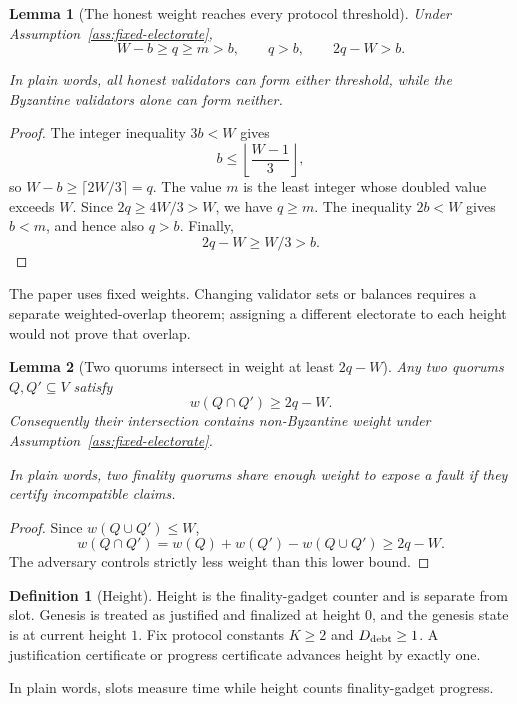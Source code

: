 \ifx\litemode\undefined\documentclass{article}\fi
\theoremstyle{plain}
\newtheorem{lemma}{Lemma}
\theoremstyle{definition}
\newtheorem{definition}{Definition}
\theoremstyle{remark}
\begin{document}
\begin{lemma}[The honest weight reaches every protocol threshold]
\label{lem:integer-thresholds}
Under Assumption~\ref{ass:fixed-electorate},
\[
  W-b\geq q\geq m>b,\qquad q>b,\qquad 2q-W>b.
\]

In plain words, all honest validators can form either threshold, while the
Byzantine validators alone can form neither.
\end{lemma}

\begin{proof}
The integer inequality \(3b<W\) gives
\[
 b\leq\left\lfloor\frac{W-1}{3}\right\rfloor,
\]
so \(W-b\geq\lceil2W/3\rceil=q\).  The value \(m\) is the least integer
whose doubled value exceeds \(W\).  Since \(2q\geq4W/3>W\), we have
\(q\geq m\).  The inequality \(2b<W\) gives \(b<m\), and hence also
\(q>b\).  Finally,
\[
 2q-W\geq W/3>b.
\]
\end{proof}

The paper uses fixed weights.  Changing validator sets or balances requires
a separate weighted-overlap theorem; assigning a different electorate to
each height would not prove that overlap.

\begin{lemma}[Two quorums intersect in weight at least \(2q-W\)]\label{lem:quorum-intersection}
Any two quorums \(Q,Q'\subseteq V\) satisfy
\[
  w(Q\cap Q')\geq 2q-W.
\]
Consequently their intersection contains non-Byzantine weight under
Assumption~\ref{ass:fixed-electorate}.

In plain words, two finality quorums share enough weight to expose a fault if
they certify incompatible claims.
\end{lemma}

\begin{proof}
Since \(w(Q\cup Q')\leq W\),
\[
 w(Q\cap Q')=w(Q)+w(Q')-w(Q\cup Q')
 \geq 2q-W.
\]
The adversary controls strictly less weight than this lower bound.
\end{proof}

\begin{definition}[Height]\label{def:height}
Height is the finality-gadget counter and is separate from slot.  Genesis is
treated as justified and finalized at height \(0\), and the genesis state is
at current height \(1\).  Fix protocol constants \(K\geq2\) and
\(D_{\rm debt}\geq1\).
A justification certificate or progress certificate advances height by
exactly one.

In plain words, slots measure time while height counts finality-gadget
progress.
\end{definition}
\end{document}
